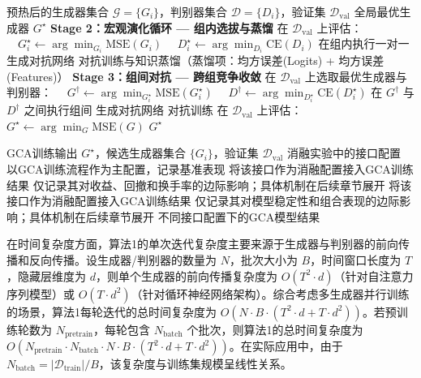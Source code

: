 \begin{algorithm}[H]
\caption{GCA 框架宏观演化与组间对抗}
\label{alg:MGCA_evolution}
\begin{algorithmic}[0]
\Require 预热后的生成器集合 $\mathcal{G} = \{G_i\}$，判别器集合 $\mathcal{D} = \{D_i\}$，验证集 $\mathcal{D}_{\text{val}}$
\Ensure 全局最优生成器 $G^{\star}$
\Statex
\State \textbf{Stage 2：宏观演化循环 — 组内选拔与蒸馏}
        \State 在 $\mathcal{D}_{\text{val}}$ 上评估：
        \State $\quad G_i^{\star} \leftarrow \arg\min_{G_i} \text{MSE}(G_i)$
        \State $\quad D_i^{\star} \leftarrow \arg\min_{D_i} \text{CE}(D_i)$
        \State 在组内执行一对一 生成对抗网络 对抗训练与知识蒸馏（蒸馏项：均方误差(Logits) + 均方误差(Features)）
    \EndFor
\EndFor
\Statex
\State \textbf{Stage 3：组间对抗 — 跨组竞争收敛}
    \State 在 $\mathcal{D}_{\text{val}}$ 上选取最优生成器与判别器：
    \State $\quad G^{\dagger} \leftarrow \arg\min_{G_i^{\star}} \text{MSE}(G_i^{\star})$
    \State $\quad D^{\dagger} \leftarrow \arg\min_{D_i^{\star}} \text{CE}(D_i^{\star})$
    \State 在 $G^{\dagger}$ 与 $D^{\dagger}$ 之间执行组间 生成对抗网络 对抗训练
\EndFor
\Statex
\State 在 $\mathcal{D}_{\text{val}}$ 上评估：$G^{\star} \leftarrow \arg\min_G \text{MSE}(G)$
\State \Return $G^{\star}$
\end{algorithmic}
\end{algorithm}

\begin{algorithm}[H]
\caption{GCA 框架可选接口配置}
\label{alg:MGCA_optional}
\begin{algorithmic}[0]
\Require GCA训练输出 $G^{\star}$，候选生成器集合 $\{G_i\}$，验证集 $\mathcal{D}_{\text{val}}$
\Ensure 消融实验中的接口配置
\State 以GCA训练流程作为主配置，记录基准表现
    \State 将该接口作为消融配置接入GCA训练结果
    \State 仅记录其对收益、回撤和换手率的边际影响；具体机制在后续章节展开
\EndIf
{}
    \State 将该接口作为消融配置接入GCA训练结果
    \State 仅记录其对模型稳定性和组合表现的边际影响；具体机制在后续章节展开
\EndIf
\State \Return 不同接口配置下的GCA模型结果
\end{algorithmic}
\end{algorithm}


在时间复杂度方面，算法1的单次迭代复杂度主要来源于生成器与判别器的前向传播和反向传播。设生成器/判别器的数量为 $N$，批次大小为 $B$，时间窗口长度为 $T$，隐藏层维度为 $d$，则单个生成器的前向传播复杂度为 $O(T^2 \cdot d)$（针对自注意力序列模型）或 $O(T \cdot d^2)$（针对循环神经网络架构）。综合考虑多生成器并行训练的场景，算法1每轮迭代的总时间复杂度为 $O(N \cdot B \cdot (T^2 \cdot d + T \cdot d^2))$。若预训练轮数为 $N_{\text{pretrain}}$，每轮包含 $N_{\text{batch}}$ 个批次，则算法1的总时间复杂度为 $O(N_{\text{pretrain}} \cdot N_{\text{batch}} \cdot N \cdot B \cdot (T^2 \cdot d + T \cdot d^2))$。在实际应用中，由于 $N_{\text{batch}} = |\mathcal{D}_{\text{train}}| / B$，该复杂度与训练集规模呈线性关系。

